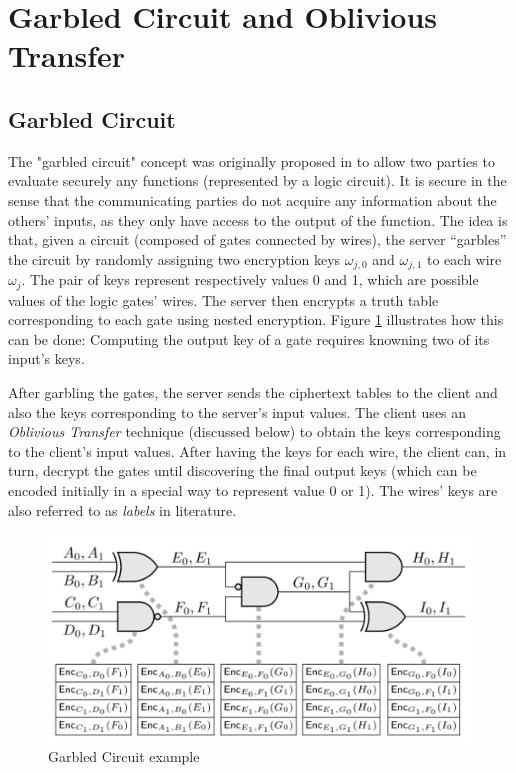 \begin{description}
\begin{enumerate}
  \end{enumerate}
\end{description}

\section{Garbled Circuit and Oblivious Transfer}
\label{sec:defMPP}

\subsection{Garbled Circuit}
\label{sec:garbledCircuitPre}

The "garbled circuit" concept was originally proposed in \cite{yao1986generate} to
allow two parties to evaluate securely any functions (represented by a logic
circuit). It is secure in the sense that the communicating parties do not acquire
any information about the others' inputs, as they only have access to the output of the
function. The idea is that, given a circuit (composed of gates connected by
wires), the server ``garbles'' the circuit by randomly assigning two encryption
keys \(\omega_{j,0}\) and \(\omega_{j,1}\) to each wire \(\omega_{j}\). The pair
of keys represent respectively values 0 and 1, which are possible values of the
logic gates' wires. The server then encrypts a truth table corresponding to each
gate using nested encryption. Figure \ref{fig:garbledCircuit} illustrates how
this can be done: Computing the output key of a gate requires knowning two of
its input's keys.

After garbling the gates, the server sends the ciphertext tables to the client
and also the keys corresponding to the server's input values. The client uses an
\textit{Oblivious Transfer } technique (discussed below) to obtain the keys
corresponding to the client's input values. After having the keys for each wire,
the client can, in turn, decrypt the gates until discovering the final output keys
(which can be encoded initially in a special way to represent value 0 or 1). The
wires' keys are also referred to as \textit{labels} in literature.

\begin{figure}[htbp!] 
  \centering    
  \includegraphics[width=1.0\textwidth]{Chapter2/Figs/Raster/garbledCircuit}
  \caption{Garbled Circuit example}
  \label{fig:garbledCircuit}
\end{figure}

